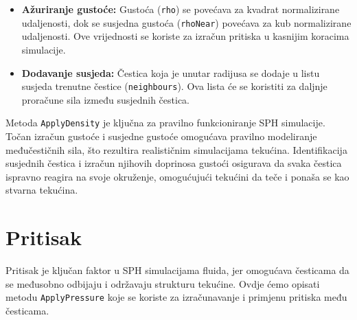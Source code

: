 \documentclass[diplomskirad]{fer}
\begin{document}
\begin{itemize}
        \item \textbf{Ažuriranje gustoće:} Gustoća (\texttt{rho}) se povećava za kvadrat normalizirane udaljenosti, dok se susjedna gustoća (\texttt{rhoNear}) povećava za kub normalizirane udaljenosti.
        Ove vrijednosti se koriste za izračun pritiska u kasnijim koracima simulacije.

        \item \textbf{Dodavanje susjeda:} Čestica koja je unutar radijusa se dodaje u listu susjeda trenutne čestice (\texttt{neighbours}). Ova lista će se koristiti za daljnje proračune sila između susjednih čestica.
    \end{itemize}

    Metoda \texttt{ApplyDensity} je ključna za pravilno funkcioniranje SPH simulacije.
    Točan izračun gustoće i susjedne gustoće omogućava pravilno modeliranje međučestičnih sila, što rezultira realističnim simulacijama tekućina.
    Identifikacija susjednih čestica i izračun njihovih doprinosa gustoći osigurava da svaka čestica ispravno reagira na svoje okruženje, omogućujući tekućini da teče i ponaša se kao stvarna tekućina.

    \section{Pritisak}\label{sec:pritisak}

    Pritisak je ključan faktor u SPH simulacijama fluida, jer omogućava česticama da se međusobno odbijaju i održavaju strukturu tekućine.
    Ovdje ćemo opisati metodu \texttt{ApplyPressure} koje se koriste za izračunavanje i primjenu pritiska među česticama.
\end{document}
